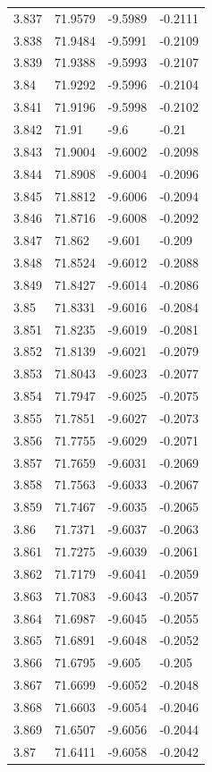 \begin{tabular}{llll}
3.837 & 71.9579 & -9.5989 & -0.2111 \\
3.838 & 71.9484 & -9.5991 & -0.2109 \\
3.839 & 71.9388 & -9.5993 & -0.2107 \\
3.84 & 71.9292 & -9.5996 & -0.2104 \\
3.841 & 71.9196 & -9.5998 & -0.2102 \\
3.842 & 71.91 & -9.6 & -0.21 \\
3.843 & 71.9004 & -9.6002 & -0.2098 \\
3.844 & 71.8908 & -9.6004 & -0.2096 \\
3.845 & 71.8812 & -9.6006 & -0.2094 \\
3.846 & 71.8716 & -9.6008 & -0.2092 \\
3.847 & 71.862 & -9.601 & -0.209 \\
3.848 & 71.8524 & -9.6012 & -0.2088 \\
3.849 & 71.8427 & -9.6014 & -0.2086 \\
3.85 & 71.8331 & -9.6016 & -0.2084 \\
3.851 & 71.8235 & -9.6019 & -0.2081 \\
3.852 & 71.8139 & -9.6021 & -0.2079 \\
3.853 & 71.8043 & -9.6023 & -0.2077 \\
3.854 & 71.7947 & -9.6025 & -0.2075 \\
3.855 & 71.7851 & -9.6027 & -0.2073 \\
3.856 & 71.7755 & -9.6029 & -0.2071 \\
3.857 & 71.7659 & -9.6031 & -0.2069 \\
3.858 & 71.7563 & -9.6033 & -0.2067 \\
3.859 & 71.7467 & -9.6035 & -0.2065 \\
3.86 & 71.7371 & -9.6037 & -0.2063 \\
3.861 & 71.7275 & -9.6039 & -0.2061 \\
3.862 & 71.7179 & -9.6041 & -0.2059 \\
3.863 & 71.7083 & -9.6043 & -0.2057 \\
3.864 & 71.6987 & -9.6045 & -0.2055 \\
3.865 & 71.6891 & -9.6048 & -0.2052 \\
3.866 & 71.6795 & -9.605 & -0.205 \\
3.867 & 71.6699 & -9.6052 & -0.2048 \\
3.868 & 71.6603 & -9.6054 & -0.2046 \\
3.869 & 71.6507 & -9.6056 & -0.2044 \\
3.87 & 71.6411 & -9.6058 & -0.2042 \\

\end{tabular}
